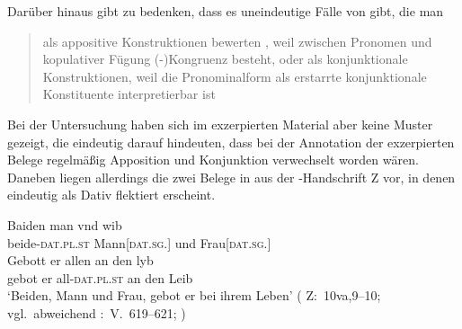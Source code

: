 Darüber hinaus gibt \citet{gjelsten1980} zu bedenken, dass es
uneindeutige Fälle von  gibt, die man
\blockcquote[187]{gjelsten1980}{als appositive Konstruktionen
bewerten , weil zwischen Pronomen und kopulativer Fügung
(-)Kongruenz besteht, oder als konjunktionale Konstruktionen, weil
die Pronominalform als erstarrte konjunktionale
Konstituente interpretierbar ist}.

Bei der Untersuchung haben sich im exzerpierten Material aber keine Muster
gezeigt, die eindeutig darauf hindeuten, dass bei der Annotation
der exzerpierten Belege regelmäßig Apposition und Konjunktion
verwechselt worden wären. Daneben liegen allerdings die zwei Belege in
 aus der \KC{}-Handschrift Z vor, in denen
 eindeutig als Dativ flektiert erscheint.

\begin{exe}
\ex \label{ex:kczbeidenundesynt1}
\begin{xlist}
	\ex \label{ex:kczbeidenundesynt1_1}
		\gll Baiden man vnd wib \\
			beide-\textsc{dat.pl\subMF.st} Mann[\textsc{dat.sg.\MascM}] und
				Frau[\textsc{dat.sg.\NeutF}] \\
	\sn \gll Gebott er allen an den lyb \\
			gebot er all-\textsc{dat.pl\subMF.st} an den Leib \\
		\trans `Beiden, Mann und Frau, gebot er bei ihrem Leben'
			(%
				Z:~10va,9--10; vgl.~abweichend
				\KC:~V.~619--621;
				\cite[92]{schroeder1895}%
			)

\end{xlist}
\end{exe}

